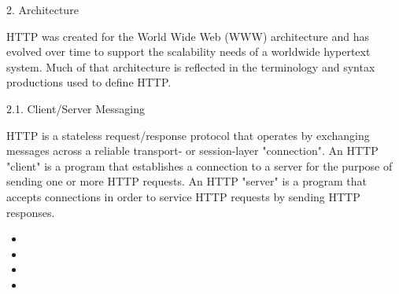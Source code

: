 
\begin{termc} [basicstyle=\footnotesize\ttfamily, frame=single]

2.  Architecture

  HTTP was created for the World Wide Web (WWW) architecture and has
  evolved over time to support the scalability needs of a worldwide
  hypertext system.  Much of that architecture is reflected in the
  terminology and syntax productions used to define HTTP.

2.1.  Client/Server Messaging

  HTTP is a stateless request/response protocol that operates by
  exchanging messages  across a reliable transport- or
  session-layer "connection".  An HTTP "client" is a
  program that establishes a connection to a server for the purpose of
  sending one or more HTTP requests.  An HTTP "server" is a program
  that accepts connections in order to service HTTP requests by sending
  HTTP responses.

\end{termc}

{

\begin{itemize}[label=$\circ$]
   \item {}
   \item {}
   \item {}
   \item {}
 \end{itemize}
}
{
}


